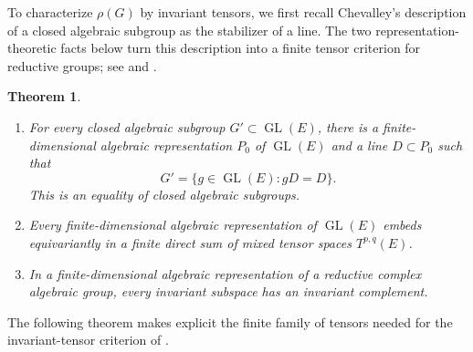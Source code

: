 \documentclass[11pt,leqno]{amsart}
\numberwithin{equation}{section}
\theoremstyle{plain}
\newtheorem{theorem}{Theorem}[section]
\theoremstyle{definition}
\theoremstyle{plain}
\theoremstyle{definition}
\theoremstyle{remark}
\begin{document}
To characterize $\rho(G)$ by invariant tensors, we first recall Chevalley's description of a closed algebraic subgroup as the stabilizer of a line.  The two representation-theoretic facts below turn this description into a finite tensor criterion for reductive groups; see \cite[Theorem~4.27]{Milne2017} and \cite[Proposition~3.1(a)--(c)]{Deligne1982}.
\begin{theorem}\label{thm:Chevalley-tensor-realization}
\begin{enumerate}[label=(\alph*),topsep=3pt,itemsep=3pt]
\item For every closed algebraic subgroup $G'\subset\operatorname{GL}(E)$, there is a finite-dimensional algebraic representation $P_0$ of $\operatorname{GL}(E)$ and a line $D\subset P_0$ such that
\[
 G'=\{g\in\operatorname{GL}(E):gD=D\}.
\]
This is an equality of closed algebraic subgroups.
\item Every finite-dimensional algebraic representation of $\operatorname{GL}(E)$ embeds equivariantly in a finite direct sum of mixed tensor spaces $T^{p,q}(E)$.
\item In a finite-dimensional algebraic representation of a reductive complex algebraic group, every invariant subspace has an invariant complement.
\end{enumerate}
\end{theorem}

The following theorem makes explicit the finite family of tensors needed for the invariant-tensor criterion of \cite[Proposition~3.1(c)]{Deligne1982}.
\end{document}
